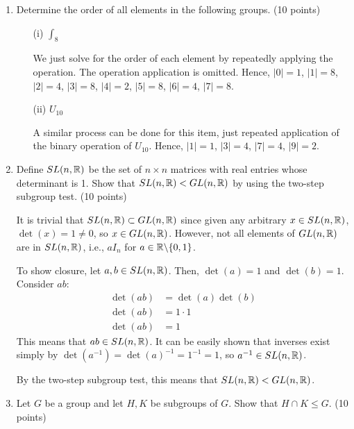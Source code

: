 \begin{enumerate}
    \item Determine the order of all elements in the following groups. (10 points)

    \begin{enumerate}
        \item[(i)] \(\int_8\)

        We just solve for the order of each element by repeatedly applying the operation. The operation application is omitted. Hence, \(|0| = 1\), \(|1| = 8\), \(|2| = 4\), \(|3| = 8\), \(|4| = 2\), \(|5| = 8\), \(|6| = 4\), \(|7| = 8\).

        \item[(ii)] \(U_{10}\)

        A similar process can be done for this item, just repeated application of the binary operation of \(U_{10}\). Hence, \(|1| = 1\), \(|3| = 4\), \(|7| = 4\), \(|9| = 2\).
    \end{enumerate}

    \item Define \(SL(n, \mathbb{R})\) be the set of \(n \times n\) matrices with real entries whose determinant is 1. Show that \(SL(n, \mathbb{R}) < GL(n, \mathbb{R})\) by using the two-step subgroup test. (10 points)

    It is trivial that \(SL(n, \mathbb{R}) \subset GL(n, \mathbb{R})\) since given any arbitrary \(x\in SL(n, \mathbb{R})\), \(\det(x) = 1 \neq 0\), so \(x \in GL(n, \mathbb{R})\). However, not all elements of \(GL(n, \mathbb{R})\) are in \(SL(n, \mathbb{R})\), i.e., \(aI_n\) for \(a \in \mathbb{R} \backslash \{0, 1\}\). 

    To show closure, let \(a,b\in SL(n, \mathbb{R})\). Then, \(\det(a) = 1\) and \(\det(b) = 1\). Consider \(ab\):
    \begin{align*}
        \det(ab) &= \det(a) \det(b) \\
        \det(ab) &= 1\cdot 1 \\
        \det(ab) &= 1
    \end{align*}
    This means that \(ab\in SL(n, \mathbb{R})\). It can be easily shown that inverses exist simply by \(\det(a^{-1}) = \det(a)^{-1} = 1^{-1} = 1\), so \(a^{-1} \in SL(n, \mathbb{R})\).

    By the two-step subgroup test, this means that \(SL(n, \mathbb{R}) < GL(n, \mathbb{R})\).

    \item Let \(G\) be a group and let \(H, K\) be subgroups of \(G\). Show that \(H \cap K \leq G\). (10 points)


\end{enumerate}
